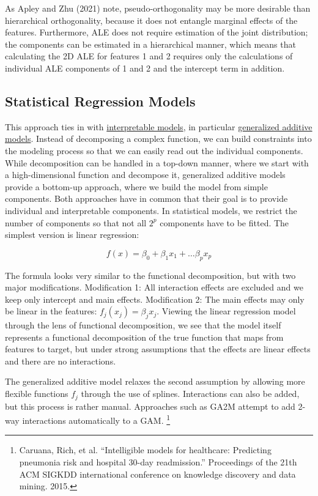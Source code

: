 \documentclass[12pt,]{krantz}
\begin{document}
As Apley and Zhu (2021) note, pseudo-orthogonality may be more desirable
than hierarchical orthogonality, because it does not entangle marginal
effects of the features. Furthermore, ALE does not require estimation of
the joint distribution; the components can be estimated in a
hierarchical manner, which means that calculating the 2D ALE for
features 1 and 2 requires only the calculations of individual ALE
components of 1 and 2 and the intercept term in addition.

\subsection{Statistical Regression
Models}\label{statistical-regression-models}

This approach ties in with \protect\hyperlink{simple}{interpretable
models}, in particular \protect\hyperlink{extend-lm}{generalized
additive models}. Instead of decomposing a complex function, we can
build constraints into the modeling process so that we can easily read
out the individual components. While decomposition can be handled in a
top-down manner, where we start with a high-dimensional function and
decompose it, generalized additive models provide a bottom-up approach,
where we build the model from simple components. Both approaches have in
common that their goal is to provide individual and interpretable
components. In statistical models, we restrict the number of components
so that not all \(2^p\) components have to be fitted. The simplest
version is linear regression:

\[f(x) = \beta_0 + \beta_1 x_1 + \ldots \beta_p x_p\]

The formula looks very similar to the functional decomposition, but with
two major modifications. Modification 1: All interaction effects are
excluded and we keep only intercept and main effects. Modification 2:
The main effects may only be linear in the features:
\(f_j(x_j)=\beta_j{}x_j\). Viewing the linear regression model through
the lens of functional decomposition, we see that the model itself
represents a functional decomposition of the true function that maps
from features to target, but under strong assumptions that the effects
are linear effects and there are no interactions.

The generalized additive model relaxes the second assumption by allowing
more flexible functions \(f_j\) through the use of splines. Interactions
can also be added, but this process is rather manual. Approaches such as
GA2M attempt to add 2-way interactions automatically to a GAM.
\footnote{Caruana, Rich, et al. ``Intelligible models for healthcare:
  Predicting pneumonia risk and hospital 30-day readmission.''
  Proceedings of the 21th ACM SIGKDD international conference on
  knowledge discovery and data mining. 2015.}
\end{document}
